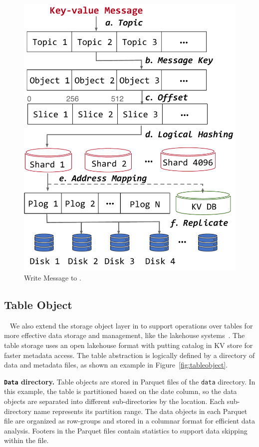 \begin{figure}[htbp]	
	\includegraphics[scale=0.3]{figures/write}
	\centering
	\vspace{-1em}
	\caption{Write Message to \sys.}
	\label{fig:write}
	\vspace{-1em}
\end{figure}


\subsection{Table Object}~\label{subsec:tableobject}
We also extend the storage object layer in \sys to support operations over tables for more effective data storage and management, like the lakehouse systems~\cite{}. The table storage uses an open lakehouse format with putting catalog in KV store  for faster metadata access. The table abstraction is logically defined by a directory of data and metadata files, as shown an example  in Figure~\ref{fig:tableobject}.

\noindent \textbf{\texttt{Data} directory.} Table objects are stored in Parquet files of the \texttt{data} directory. In this example, the table is partitioned based on the date column, so the data objects are separated into different sub-directories by the location. Each sub-directory name represents its partition range. The data objects in each Parquet file are organized as row-groups and stored in a columnar format for efficient data analysis. Footers in the Parquet files contain statistics to support data skipping within the file.




